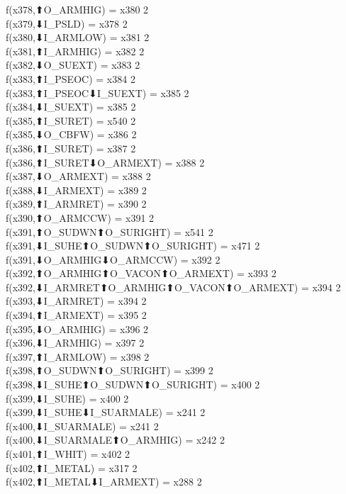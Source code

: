 f(x378,⬆O_ARMHIG) = x380 {2} \\
f(x379,⬇I_PSLD) = x378 {2} \\
f(x380,⬇I_ARMLOW) = x381 {2} \\
f(x381,⬆I_ARMHIG) = x382 {2} \\
f(x382,⬇O_SUEXT) = x383 {2} \\
f(x383,⬆I_PSEOC) = x384 {2} \\
f(x383,⬆I_PSEOC⬇I_SUEXT) = x385 {2} \\
f(x384,⬇I_SUEXT) = x385 {2} \\
f(x385,⬆I_SURET) = x540 {2} \\
f(x385,⬇O_CBFW) = x386 {2} \\
f(x386,⬆I_SURET) = x387 {2} \\
f(x386,⬆I_SURET⬇O_ARMEXT) = x388 {2} \\
f(x387,⬇O_ARMEXT) = x388 {2} \\
f(x388,⬇I_ARMEXT) = x389 {2} \\
f(x389,⬆I_ARMRET) = x390 {2} \\
f(x390,⬆O_ARMCCW) = x391 {2} \\
f(x391,⬆O_SUDWN⬆O_SURIGHT) = x541 {2} \\
f(x391,⬇I_SUHE⬆O_SUDWN⬆O_SURIGHT) = x471 {2} \\
f(x391,⬇O_ARMHIG⬇O_ARMCCW) = x392 {2} \\
f(x392,⬆O_ARMHIG⬆O_VACON⬆O_ARMEXT) = x393 {2} \\
f(x392,⬇I_ARMRET⬆O_ARMHIG⬆O_VACON⬆O_ARMEXT) = x394 {2} \\
f(x393,⬇I_ARMRET) = x394 {2} \\
f(x394,⬆I_ARMEXT) = x395 {2} \\
f(x395,⬇O_ARMHIG) = x396 {2} \\
f(x396,⬇I_ARMHIG) = x397 {2} \\
f(x397,⬆I_ARMLOW) = x398 {2} \\
f(x398,⬆O_SUDWN⬆O_SURIGHT) = x399 {2} \\
f(x398,⬇I_SUHE⬆O_SUDWN⬆O_SURIGHT) = x400 {2} \\
f(x399,⬇I_SUHE) = x400 {2} \\
f(x399,⬇I_SUHE⬇I_SUARMALE) = x241 {2} \\
f(x400,⬇I_SUARMALE) = x241 {2} \\
f(x400,⬇I_SUARMALE⬆O_ARMHIG) = x242 {2} \\
f(x401,⬆I_WHIT) = x402 {2} \\
f(x402,⬆I_METAL) = x317 {2} \\
f(x402,⬆I_METAL⬇I_ARMEXT) = x288 {2} \\
